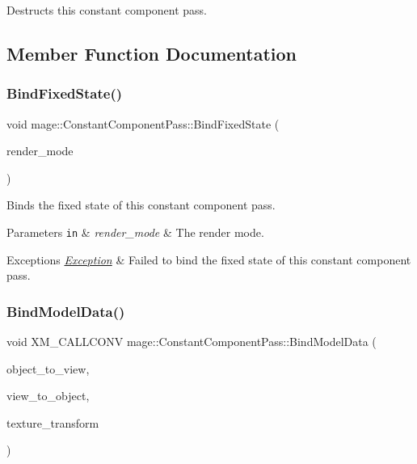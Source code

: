 Destructs this constant component pass. 

\subsection{Member Function Documentation}
\hypertarget{classmage_1_1_constant_component_pass_a87e9d62d5d93b1a66388ab0ccd494e8b}{}\label{classmage_1_1_constant_component_pass_a87e9d62d5d93b1a66388ab0ccd494e8b} 
\subsubsection{\texorpdfstring{Bind\+Fixed\+State()}{BindFixedState()}}
{\footnotesize\ttfamily void mage\+::\+Constant\+Component\+Pass\+::\+Bind\+Fixed\+State (\begin{DoxyParamCaption}\item[{\hyperlink{namespacemage_a9d24b35ed0bdecf8535e2b91fe0eebba}{Render\+Mode}}]{render\+\_\+mode }\end{DoxyParamCaption})}

Binds the fixed state of this constant component pass.


\begin{DoxyParams}[1]{Parameters}
\mbox{\tt in}  & {\em render\+\_\+mode} & The render mode. \\
\hline
\end{DoxyParams}

\begin{DoxyExceptions}{Exceptions}
{\em \hyperlink{classmage_1_1_exception}{Exception}} & Failed to bind the fixed state of this constant component pass. \\
\hline
\end{DoxyExceptions}
\hypertarget{classmage_1_1_constant_component_pass_a196372d184f74c8f268adc1e7865ef17}{}\label{classmage_1_1_constant_component_pass_a196372d184f74c8f268adc1e7865ef17} 
\subsubsection{\texorpdfstring{Bind\+Model\+Data()}{BindModelData()}}
{\footnotesize\ttfamily void X\+M\+\_\+\+C\+A\+L\+L\+C\+O\+NV mage\+::\+Constant\+Component\+Pass\+::\+Bind\+Model\+Data (\begin{DoxyParamCaption}\item[{F\+X\+M\+M\+A\+T\+R\+IX}]{object\+\_\+to\+\_\+view,  }\item[{C\+X\+M\+M\+A\+T\+R\+IX}]{view\+\_\+to\+\_\+object,  }\item[{C\+X\+M\+M\+A\+T\+R\+IX}]{texture\+\_\+transform }\end{DoxyParamCaption})\hspace{0.3cm}{\ttfamily [private]}}

